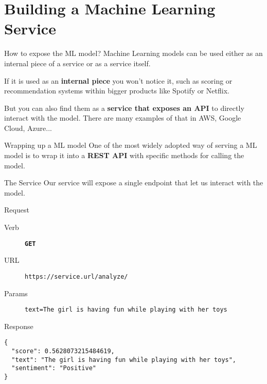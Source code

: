 \section{Building a Machine Learning Service}
\begin{frame}{How to expose the ML model?}
    Machine Learning models can be used either as an internal piece of a service or as a service itself.

    If it is used as an \textbf{internal piece} you won't notice it, such as scoring or recommendation systems within bigger products like Spotify or Netflix.

    But you can also find them as a \textbf{service that exposes an API} to directly interact with the model. There are many examples of that in AWS, Google Cloud, Azure...
\end{frame}

\begin{frame}{Wrapping up a ML model}
    One of the most widely adopted way of serving a ML model is to wrap it into a \textbf{REST API} with specific methods for calling the model.
\end{frame}

\begin{frame}[fragile]{The Service}
    Our service will expose a single endpoint that let us interact with the model.

    \begin{exampleblock}{Request}
        {
            \footnotesize
            \begin{description}
                \item[Verb] \texttt{\textbf{GET}}
                \item[URL] \texttt{https://service.url/analyze/}
                \item[Params] \texttt{text=The girl is having fun while playing with her toys}
            \end{description}
        }
    \end{exampleblock}

    \begin{exampleblock}{Response}
        \begin{verbatim}
{
  "score": 0.5628073215484619,
  "text": "The girl is having fun while playing with her toys",
  "sentiment": "Positive"
}
        \end{verbatim}
    \end{exampleblock}
\end{frame}

